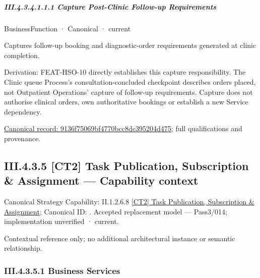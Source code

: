 \subparagraph*{III.4.3.4.1.1.1 Capture Post-Clinic Follow-up Requirements}
\label{navigation:III.4.3.4.1.1.1}

\label{element:9136f75069bf4770bcc8dc395204d475}
{\small BusinessFunction · Canonical · current}\par

Captures follow-up booking and diagnostic-order requirements generated at clinic completion.



Derivation: FEAT-HSO-10 directly establishes this capture responsibility. The Clinic queue Process's consultation-concluded checkpoint describes orders placed, not Outpatient Operations' capture of follow-up requirements. Capture does not authorise clinical orders, own authoritative bookings or establish a new Service dependency.


{\footnotesize \href{../../../../../../../continuum/business/business-function/9136f75069bf4770bcc8dc395204d475.md}{Canonical record: 9136f75069bf4770bcc8dc395204d475}; full qualifications and provenance.}\par
\subsection*{III.4.3.5 [CT2] Task Publication, Subscription \& Assignment — Capability context}
\label{navigation:III.4.3.5}

{\small Canonical Strategy Capability: II.1.2.6.8 \hyperref[element:f41e5bfc2b5845bbbb3290ecf8b57892]{[CT2] Task Publication, Subscription \& Assignment}; Canonical ID: \texttt{}. Accepted replacement model — Pass3/014; implementation unverified · current.}\par
Contextual reference only; no additional architectural instance or semantic relationship.\par
\subsubsection*{III.4.3.5.1 Business Services}
\label{navigation:III.4.3.5.1}

